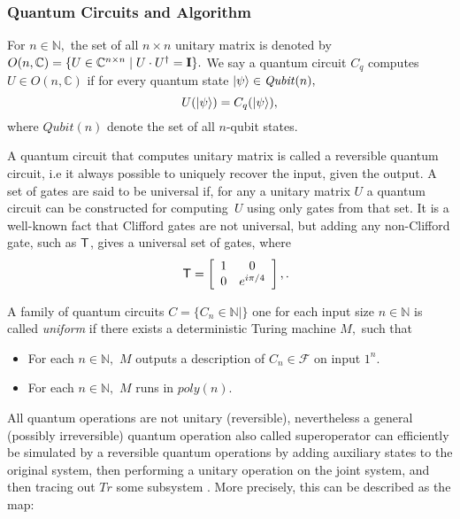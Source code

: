 \subsubsection{Quantum Circuits and Algorithm}

For $n\in \mathbb{N},$ the set of all $n\times n$ unitary matrix is denoted by $O(n,\mathbb{C})=\{U\in \mathbb{C}^{n\times n} \mid U\cdot U^\dagger={\bf I}\}.$ We say a quantum circuit $C_q$ computes $U\in O(n,\mathbb{C})$ if for every quantum state ${\lvert}\psi\rangle \in \mathit{Qubit}(n),$
$$U({\lvert}\psi\rangle )=C_q({\lvert}\psi\rangle),$$
where  $\mathit{Qubit}(n)$  denote the set of all $n$-qubit states. 

A quantum circuit that computes unitary matrix is called a reversible  quantum circuit, i.e it always possible to uniquely recover the input, given the output. A set of gates are said to be universal if, for any a unitary matrix $U$  a quantum circuit can be constructed for computing~$U$ using only gates from that set. It is a well-known fact that Clifford gates are not universal, but adding any non-Clifford gate, such as ${\sf T}$, gives a universal set of gates, where
$$\quad{\sf T} = \left[\begin{array}{cc} 1 & 0\\ 0 & e^{i\pi/4}\end{array}\right],.$$

A family of quantum circuits $C=\{C_n\in \mathbb{N} \mid \}$ one for each input  size $n\in \mathbb{N}$ is called \emph{uniform} if there exists a deterministic Turing machine $M,$ such that
 \begin{itemize}
 \item For each $n\in\mathbb{N},$ $M$ outputs a description of $C_n \in \mathcal{F}$ on input $1^n.$
 \item  For each $n\in\mathbb{N},$ $M$ runs in $poly(n).$
 \end{itemize}

All quantum operations are not unitary (reversible), nevertheless a general (possibly irreversible) quantum operation also called superoperator can efficiently be simulated by a reversible quantum operations by adding auxiliary states to the original system, then performing a unitary operation on the joint system, and then tracing out $Tr$ some subsystem \cite{}.  More precisely, this can be described as the map:

